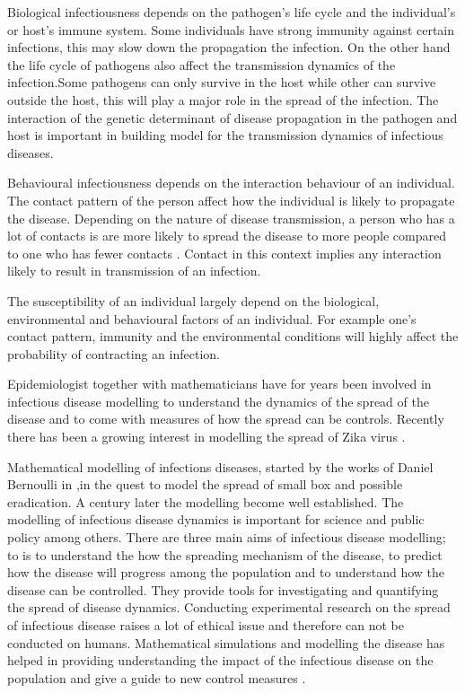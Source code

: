   Biological infectiousness depends on the pathogen's life cycle and the individual's or host's immune system. Some individuals have strong immunity against certain infections, this may  slow down the propagation the infection. On the other hand the life cycle of  pathogens also affect the transmission dynamics of the infection.Some pathogens can only survive in the host while other can survive outside the host, this will play a major role in the spread of the infection.  The interaction of the genetic determinant of disease propagation in the pathogen and host is important in building model for the transmission dynamics of infectious diseases.
  
Behavioural infectiousness depends on the interaction behaviour of an individual. The contact pattern of the person affect how the individual is likely to propagate   the disease. Depending on the nature of disease transmission, a person who has  a lot of contacts is are more likely to spread the disease to more people compared to one who has fewer contacts \citep{johnson2001sexual}. Contact in this context implies any interaction likely to result in transmission of an infection.

The susceptibility of an individual largely depend on the biological, environmental and behavioural factors of an individual. For example one's contact pattern, immunity and the environmental conditions will highly affect the probability of contracting an infection.

Epidemiologist together with mathematicians have for years been involved in infectious disease modelling to understand the dynamics of the spread of the disease and to come with measures of how the spread can be controls. Recently there has been a growing interest in modelling the spread of Zika virus \citep{ku2016}.

Mathematical modelling of infections diseases, started by the works of Daniel Bernoulli in \cite{bernoulli1760essai},in the quest to model the spread of small box and possible eradication. A century later the modelling become well established. The modelling of infectious disease dynamics is important for science and public policy among others. There are three main aims of infectious disease modelling; to is to understand the how the spreading mechanism of the disease, to  predict how the disease will progress among the population and to understand how the disease can be controlled. They provide tools for investigating and quantifying the spread of disease dynamics. Conducting experimental research on the spread of infectious disease raises a lot of ethical issue and therefore can not be conducted on humans. Mathematical simulations and modelling the disease has helped in providing understanding the impact of the infectious disease on the population and give a guide to new control measures \citep{ming2016stochastic}.

